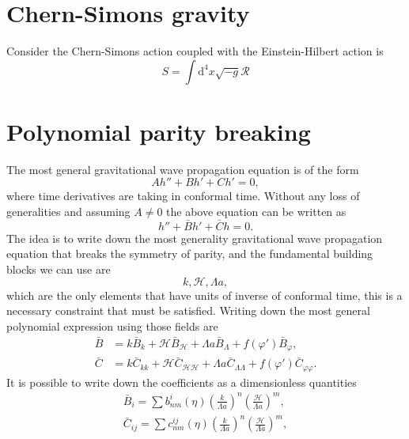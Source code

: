 \documentclass{article}
\begin{document}
\section{Chern-Simons gravity}

Consider the Chern-Simons action coupled with the Einstein-Hilbert action is
\begin{equation}
    S = \int \mathrm{d}^4x \sqrt{-g}\mathcal{R}
\end{equation}

\section{Polynomial parity breaking}

The most general gravitational wave propagation equation is of the form
\begin{equation}
    Ah'' + Bh' + Ch' = 0,
\end{equation}
where time derivatives are taking in conformal time. Without any loss of generalities 
and assuming $A \neq 0 $ the above equation can be written as 
\begin{equation}
    h'' + \bar{B}h' + \bar{C}h = 0.
\end{equation}
The idea is to write down the most generality gravitational wave propagation equation that 
breaks the symmetry of parity, and the fundamental building blocks we can use are 
\begin{equation}
     k ,\mathcal{H} ,\Lambda a ,
\end{equation}
which are the only elements that have units of inverse of conformal time, this is a necessary
constraint that must be satisfied. Writing down the most general polynomial expression using those
fields are
\begin{align}
    \bar{B} & = k\bar{B}_{k} + \mathcal{H}\bar{B}_{\mathcal{H}} + \Lambda a\bar{B}_{\Lambda}
    + f(\varphi')\bar{B}_{\varphi}, \label{B polynomial}\\
    \bar{C} & = k\bar{C}_{kk} + \mathcal{H}\bar{C}_{\mathcal{H}\mathcal{H}} 
    + \Lambda a\bar{C}_{\Lambda\Lambda} + f(\varphi')\bar{C}_{\varphi\varphi}. \label{C polynomial}
\end{align}
It is possible to write down the coefficients as a dimensionless quantities 
\begin{align}
    \bar{B}_{i} = \sum b^{i}_{nm}\left(\eta\right)\left(\frac{k}{\Lambda a}\right)^{n}
    \left(\frac{\mathcal{H}}{\Lambda a}\right)^{m}, \label{B sum} \\
    \bar{C}_{ij} = \sum c^{ij}_{nm}\left(\eta\right)\left(\frac{k}{\Lambda a}\right)^{n}
    \left(\frac{\mathcal{H}}{\Lambda a}\right)^{m} \label{C sum}, 
\end{align}
\end{document}
